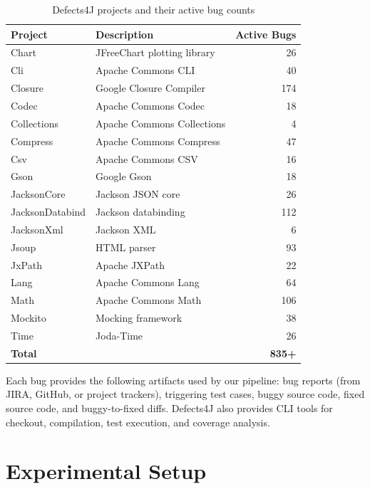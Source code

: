 \documentclass{iutbscthesis}
\begin{document}
\begin{table}[H]
    \centering
    \begin{tabular}{l l r}
        \toprule
        \textbf{Project} & \textbf{Description} & \textbf{Active Bugs} \\
        \midrule
        Chart & JFreeChart plotting library & 26 \\
        Cli & Apache Commons CLI & 40 \\
        Closure & Google Closure Compiler & 174 \\
        Codec & Apache Commons Codec & 18 \\
        Collections & Apache Commons Collections & 4 \\
        Compress & Apache Commons Compress & 47 \\
        Csv & Apache Commons CSV & 16 \\
        Gson & Google Gson & 18 \\
        JacksonCore & Jackson JSON core & 26 \\
        JacksonDatabind & Jackson databinding & 112 \\
        JacksonXml & Jackson XML & 6 \\
        Jsoup & HTML parser & 93 \\
        JxPath & Apache JXPath & 22 \\
        Lang & Apache Commons Lang & 64 \\
        Math & Apache Commons Math & 106 \\
        Mockito & Mocking framework & 38 \\
        Time & Joda-Time & 26 \\
        \midrule
        \textbf{Total} & & \textbf{835+} \\
        \bottomrule
    \end{tabular}
    \caption{Defects4J projects and their active bug counts}
    \label{tab:d4j_projects}
\end{table}

Each bug provides the following artifacts used by our pipeline: bug reports (from JIRA, GitHub, or project trackers), triggering test cases, buggy source code, fixed source code, and buggy-to-fixed diffs. Defects4J also provides CLI tools for checkout, compilation, test execution, and coverage analysis.

\section{Experimental Setup}
\end{document}
